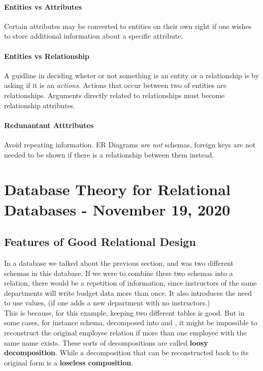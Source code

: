 \documentclass[11pt,a4paper,twocolumn]{book}
\begin{document}
\subsubsection{Entities vs Attributes}

Certain attributes may be converted to entities on their own right if one wishes to store additional information about a specific attribute.

\subsubsection{Entities vs Relationship}

A guidline in deciding wheter or not something is an entity or a relationship is by asking if it is an \textit{actions}. Actions that occur between two of entities are relationships. Arguments directly related to relationships must become relationship attributes.

\subsubsection{Redunantant Atttributes}

Avoid repeating information. ER Diagrams \textit{are not} schemas, foreign keys are not needed to be shown if there is a relationship between them instead.

\chapter{Database Theory for Relational Databases - November 19, 2020}

\section{Features of Good Relational Design}

In a database we talked about the previous section,  and  was two different schemas in this database. If we were to combine these two schemas into a relation, there would be a repetition of information, since instructors of the same departments will write budget data more than once. It also introduces the need to use  values, (if one adds a new department with no instructors.)\\

This is because, for this example, keeping two different tables is good. But in some cases, for instance  schema, decomposed into  and , it might be impossible to reconstruct the original employee relation if more than one employee with the same name exists. These sorts of decompositions are called \textbf{loosy decomposition}. While a decomposition that can be reconstructed back to its original form is a \textbf{loseless composition}.\\
\end{document}
